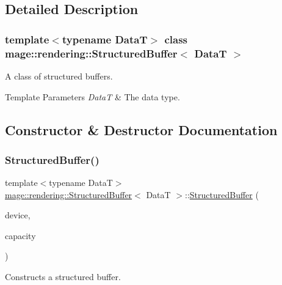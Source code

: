 \subsection{Detailed Description}
\subsubsection*{template$<$typename DataT$>$\newline
class mage\+::rendering\+::\+Structured\+Buffer$<$ Data\+T $>$}

A class of structured buffers.


\begin{DoxyTemplParams}{Template Parameters}
{\em DataT} & The data type. \\
\hline
\end{DoxyTemplParams}


\subsection{Constructor \& Destructor Documentation}
\mbox{\label{classmage_1_1rendering_1_1_structured_buffer_a7a12044b41fccd5c3a9c6d600ae8fd14}} 
\subsubsection{\texorpdfstring{Structured\+Buffer()}{StructuredBuffer()}\hspace{0.1cm}{\footnotesize\ttfamily [1/3]}}
{\footnotesize\ttfamily template$<$typename DataT$>$ \\
\mbox{\hyperlink{classmage_1_1rendering_1_1_structured_buffer}{mage\+::rendering\+::\+Structured\+Buffer}}$<$ DataT $>$\+::\mbox{\hyperlink{classmage_1_1rendering_1_1_structured_buffer}{Structured\+Buffer}} (\begin{DoxyParamCaption}\item[{I\+D3\+D11\+Device \&}]{device,  }\item[{size\+\_\+t}]{capacity }\end{DoxyParamCaption})\hspace{0.3cm}{\ttfamily [explicit]}}

Constructs a structured buffer.


